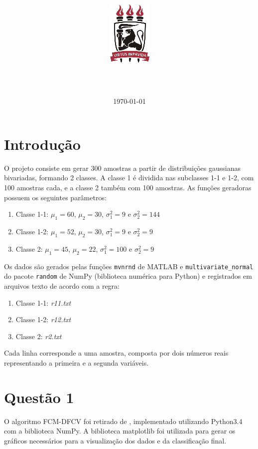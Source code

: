 \documentclass[12pt,twoside]{report}
\title{
    {\includegraphics{ufpelogo.png}}
    \\
    {\large \universityname}
    \\
    {\large \centername}
    \vfill
    \textbf{\papertitle}
    \vfill
}
\author{\authorname}
\date{\normalsize\vfill \today}
\newcommand{\code}[1]{\texttt{#1}}
\begin{document}
\maketitle

\chapter*{Introdução}

O projeto consiste em gerar 300 amostras a partir de distribuições gaussianas
bivariadas, formando 2 classes. A classe 1 é dividida nas subclasses 1-1 e 1-2,
com 100 amostras cada, e a classe 2 também com 100 amostras. As funções geradoras
possuem os seguintes parâmetros:

\begin{enumerate}
    \item Classe 1-1: $\mu_1 = 60$, $\mu_2 = 30$, $\sigma_1^2 = 9$ e $\sigma_2^2 = 144$
    \item Classe 1-2: $\mu_1 = 52$, $\mu_2 = 30$, $\sigma_1^2 = 9$ e $\sigma_2^2 = 9$
    \item Classe 2: $\mu_1 = 45$, $\mu_2 = 22$, $\sigma_1^2 = 100$ e $\sigma_2^2 = 9$
\end{enumerate}

Os dados são gerados pelas funções \code{mvnrnd} de MATLAB e \code{multivariate\_normal}
do pacote \code{random} de NumPy (biblioteca numérica para Python) e registrados
em arquivos texto de acordo com a regra:

\begin{enumerate}\itemsep0pt
    \item Classe 1-1: \emph{r11.txt}
    \item Classe 1-2: \emph{r12.txt}
    \item Classe 2: \emph{r2.txt}
\end{enumerate}

\noindent Cada linha corresponde a uma amostra, composta por dois números reais
representando a primeira e a segunda variáveis.


\chapter*{Questão 1}

O algoritmo FCM-DFCV foi retirado de \autocite{carvalho.tenorio.cavalcanti.2006},
implementado utilizando Python3.4 com a biblioteca NumPy. A biblioteca matplotlib
foi utilizada para gerar os gráficos necessários para a visualização dos dados e
da classificação final.
\end{document}
